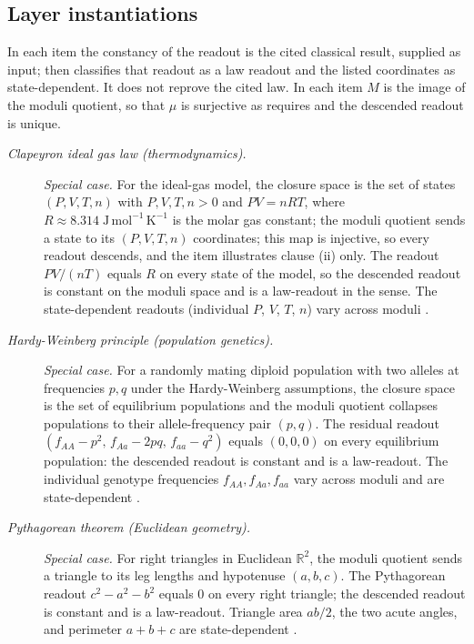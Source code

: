 \subsection*{Layer instantiations}\label{layer-inst:F46}

\begingroup\small
\noindent In each item the constancy of the readout is the cited classical
result, supplied as input;  then classifies that readout as a law
readout and the listed coordinates as state-dependent. It does not reprove the
cited law. In each item \(M\) is the image of the moduli quotient, so that \(\mu\) is surjective as  requires and the descended readout is unique.
\begin{description}
\item[\emph{Clapeyron ideal gas law (thermodynamics).}] \textit{Special case.}
For the ideal-gas model, the closure space is the
set of states \((P,V,T,n)\) with \(P,V,T,n>0\) and \(PV=nRT\), where
\(R\approx8.314\;\mathrm{J\,mol^{-1}\,K^{-1}}\) is the molar gas constant; the
moduli quotient sends a state to its \((P,V,T,n)\) coordinates; this map is
injective, so every readout descends, and the item illustrates clause (ii) only.  The readout
\(PV/(nT)\) equals \(R\) on every state of the model, so the descended readout is
constant on the moduli space and is a law-readout
in the  sense.  The state-dependent readouts
(individual \(P\), \(V\), \(T\), \(n\)) vary across
moduli \citep{Clapeyron1834Memoire}.

\item[\emph{Hardy-Weinberg principle (population
genetics).}] \textit{Special case.}
For a randomly mating diploid population with two
alleles at frequencies \(p,q\) under the
Hardy-Weinberg assumptions, the closure space is
the set of equilibrium populations and the moduli
quotient collapses populations to their
allele-frequency pair \((p,q)\).  The residual readout
\((f_{AA}-p^2,\,f_{Aa}-2pq,\,f_{aa}-q^2)\) equals
\((0,0,0)\) on every equilibrium population: the
descended readout is constant and is a law-readout.
The individual genotype frequencies
\(f_{AA},f_{Aa},f_{aa}\) vary across moduli and are
state-dependent \citep{Hardy1908Mendelian}.

\item[\emph{Pythagorean theorem (Euclidean
geometry).}] \textit{Special case.}
For right triangles in Euclidean \(\mathbb R^2\),
the moduli quotient sends a triangle to its leg
lengths and hypotenuse \((a,b,c)\).  The Pythagorean
readout \(c^2-a^2-b^2\) equals \(0\) on every right
triangle; the descended readout is constant and is
a law-readout.  Triangle area \(ab/2\), the two acute
angles, and perimeter \(a+b+c\) are state-dependent
\citep{Euclid300BCElements}.


\end{description}
